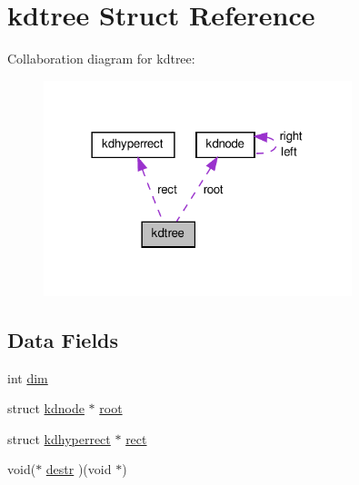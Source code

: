 \hypertarget{a00011}{\section{kdtree \-Struct \-Reference}
\label{da/d45/a00011}
}


\-Collaboration diagram for kdtree\-:
\nopagebreak
\begin{figure}[H]
\begin{center}
\leavevmode
\includegraphics[width=254pt]{db/d3a/a00040}
\end{center}
\end{figure}
\subsection*{\-Data \-Fields}
\begin{DoxyCompactItemize}
\item 
int \hyperlink{a00011_a70b5e28b5bc3d1b63a7435c5fe50b837_a70b5e28b5bc3d1b63a7435c5fe50b837}{dim}
\item 
struct \hyperlink{a00009}{kdnode} $\ast$ \hyperlink{a00011_a75f7244d061840423e44a33990f08d07_a75f7244d061840423e44a33990f08d07}{root}
\item 
struct \hyperlink{a00008}{kdhyperrect} $\ast$ \hyperlink{a00011_aa40b9a36013f3e2014bd44fb27909ca2_aa40b9a36013f3e2014bd44fb27909ca2}{rect}
\item 
void($\ast$ \hyperlink{a00011_a7d06069e4fb5ffe40d5db88c0081f3ac_a7d06069e4fb5ffe40d5db88c0081f3ac}{destr} )(void $\ast$)
\end{DoxyCompactItemize}


